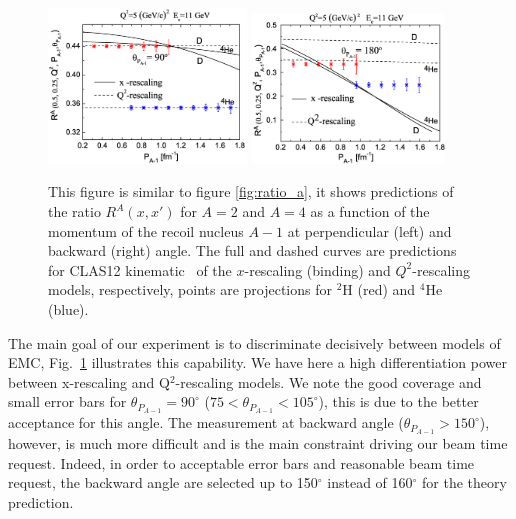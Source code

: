 \begin{figure}[tbp]
  \begin{center}
    \includegraphics[angle=0, width=0.47\textwidth]{./fig-chap3/Fig5New_90}
    \includegraphics[angle=0, width=0.455\textwidth]{./fig-chap3/Fig5New_180}
    \caption{This figure is similar to figure \ref{fig:ratio_a}, it shows predictions of the ratio $R^A(x,x')$ for $A = 2$ and $A = 4$ as a function of the momentum of the recoil nucleus $A-1$ at perpendicular (left) and backward (right) angle. The full and dashed curves are predictions for CLAS12 kinematic~\cite{CiofidegliAtti1999,CiofidegliAtti2012} of the $x$-rescaling (binding) and $Q^2$-rescaling models, respectively, points are projections for $^2$H (red) and $^4$He (blue).}
    \label{fig:ratio_a_proj}
  \end{center}
\end{figure}

The main goal of our experiment is to discriminate decisively between models of EMC, Fig.~\ref{fig:ratio_a_proj} illustrates this capability. We have here a high differentiation power between x-rescaling and Q$^2$-rescaling models. We note the good coverage and small error bars for $\theta_{P_{A-1}} = 90^\circ$ ($75 < \theta_{P_{A-1}} <105^\circ$), this is due to the better acceptance for this angle. The measurement at backward angle ($\theta_{P_{A-1}} > 150^\circ$), however, is much more difficult and is the main constraint driving our beam time request. Indeed, in order to acceptable error bars and reasonable beam time request, the backward angle are selected up to 150$^\circ$ instead of 160$^\circ$ for the theory prediction.

